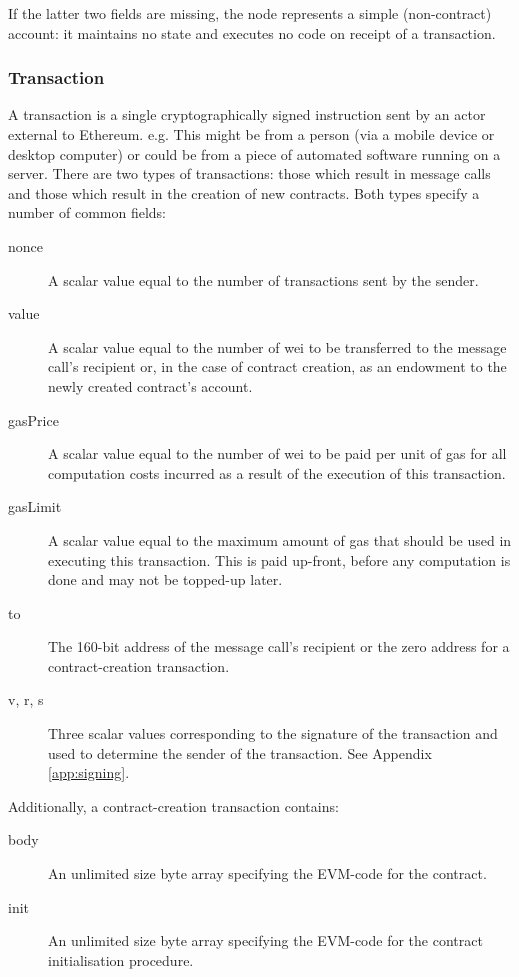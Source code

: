 \documentclass[9pt,oneside]{amsart}
\begin{document}
\begin{multicols}{2}
If the latter two fields are missing, the node represents a simple (non-contract) account: it maintains no state and executes no code on receipt of a transaction.

\subsubsection{Transaction} \label{ch:transaction}

A transaction is a single cryptographically signed instruction sent by an actor external to Ethereum. e.g. This might be from a person (via a mobile device or desktop computer) or could be from a piece of automated software running on a server. There are two types of transactions: those which result in message calls and those which result in the creation of new contracts. Both types specify a number of common fields:

\begin{description}
\item[nonce] A scalar value equal to the number of transactions sent by the sender.
\item[value] A scalar value equal to the number of wei to be transferred to the message call's recipient or, in the case of contract creation, as an endowment to the newly created contract's account.
\item[gasPrice] A scalar value equal to the number of wei to be paid per unit of gas for all computation costs incurred as a result of the execution of this transaction.
\item[gasLimit] A scalar value equal to the maximum amount of gas that should be used in executing this transaction. This is paid up-front, before any computation is done and may not be topped-up later.
\item[to] The 160-bit address of the message call's recipient or the zero address for a contract-creation transaction.
\item[v, r, s] Three scalar values corresponding to the signature of the transaction and used to determine the sender of the transaction. See Appendix \ref{app:signing}.
\end{description}

Additionally, a contract-creation transaction contains:

\begin{description}
\item[body] An unlimited size byte array specifying the EVM-code for the contract.
\item[init] An unlimited size byte array specifying the EVM-code for the contract initialisation procedure.
\end{description}


\end{multicols}
\end{document}
